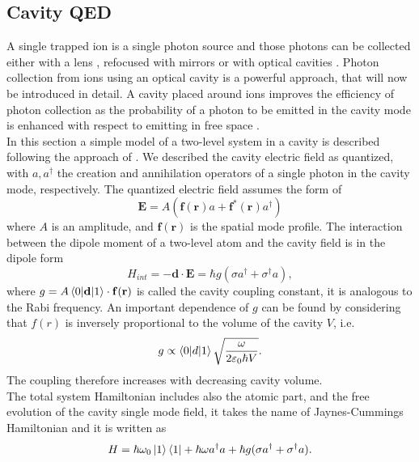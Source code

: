 \subsection{Cavity QED}
\label{sec:cavityqed}
A single trapped ion is a single photon source and those photons can be collected either with a lens \cite{ion_quantumnetwork}, refocused with mirrors \cite{PhysRevLett.120.193603} or with optical cavities \cite{Keller2004bis}. Photon collection from ions using an optical cavity is a powerful approach, that will now be introduced in detail. A cavity placed around ions improves the efficiency of photon collection as the probability of a photon to be emitted in the cavity mode is enhanced with respect to emitting in free space \cite{Kimble_1998}.\\
In this section a simple model of a two-level system in a cavity is described following the approach of \cite{steck}. We described the cavity electric field as quantized, with $a,a^\dagger$ the creation and annihilation operators of a single photon in the cavity mode, respectively.
The quantized electric field assumes the form of
\begin{equation}
\mathbf{E} = A(\mathbf{f}(\mathbf{r})a + \mathbf{f}^*(\mathbf{r})a^\dagger)
\end{equation}
where $A$ is an amplitude, and $\mathbf{f}(\mathbf{r})$ is the spatial mode profile. The interaction between the dipole moment of a two-level atom and the cavity field is in the dipole form
\begin{equation}
H_{int}  = -\mathbf{d}\cdot \mathbf{E} = \hbar g (\sigma a^\dagger + \sigma^\dagger a),
\end{equation}
where $g = A \braket{0|\mathbf{d}|1}\cdot \mathbf{f}(\mathbf{r})$ is called the cavity coupling constant, it is analogous to the Rabi frequency. An important dependence of $g$ can be found by considering that $f(r)$ is inversely proportional to the volume of the cavity $V$, i.e.
\begin{equation}
g \propto \braket{0|d|1} \sqrt{\frac{\omega}{2\varepsilon_0 \hbar V}}.
\end{equation}
The coupling therefore increases with decreasing cavity volume.\\
The total system Hamiltonian includes also the atomic part, and the free evolution of the cavity single mode field, it takes the name of Jaynes-Cummings Hamiltonian and it is written as \cite{qedreview}
\begin{equation}
\label{eq:jchamiltonian}
H = \hbar \omega_0 \ket{1}\bra{1} + \hbar \omega a^\dagger a + \hbar g (\sigma a^\dagger + \sigma^\dagger a).
\end{equation}
